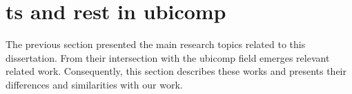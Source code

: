 \section{\acs{ts} and \acs{rest} in \acl{ubicomp}}
\label{sec:soa_ubicomp}

The previous section presented the main research topics related to this dissertation.
From their intersection with the \ac{ubicomp} field emerges relevant related work.
Consequently, this section describes these works and presents their differences and similarities with our work.



